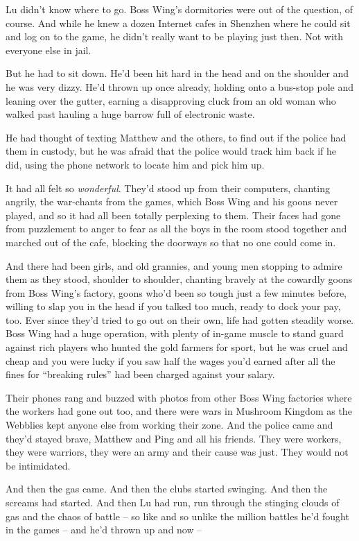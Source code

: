 Lu didn't know where to go. Boss Wing's dormitories were out of the
question, of course. And while he knew a dozen Internet cafes in
Shenzhen where he could sit and log on to the game, he didn't
really want to be playing just then. Not with everyone else in
jail.

But he had to sit down. He'd been hit hard in the head and on the
shoulder and he was very dizzy. He'd thrown up once already,
holding onto a bus-stop pole and leaning over the gutter, earning a
disapproving cluck from an old woman who walked past hauling a huge
barrow full of electronic waste.

He had thought of texting Matthew and the others, to find out if
the police had them in custody, but he was afraid that the police
would track him back if he did, using the phone network to locate
him and pick him up.

It had all felt so \emph{wonderful}. They'd stood up from their
computers, chanting angrily, the war-chants from the games, which
Boss Wing and his goons never played, and so it had all been
totally perplexing to them. Their faces had gone from puzzlement to
anger to fear as all the boys in the room stood together and
marched out of the cafe, blocking the doorways so that no one could
come in.

And there had been girls, and old grannies, and young men stopping
to admire them as they stood, shoulder to shoulder, chanting
bravely at the cowardly goons from Boss Wing's factory, goons who'd
been so tough just a few minutes before, willing to slap you in the
head if you talked too much, ready to dock your pay, too. Ever
since they'd tried to go out on their own, life had gotten steadily
worse. Boss Wing had a huge operation, with plenty of in-game
muscle to stand guard against rich players who hunted the gold
farmers for sport, but he was cruel and cheap and you were lucky if
you saw half the wages you'd earned after all the fines for
``breaking rules'' had been charged against your salary.

Their phones rang and buzzed with photos from other Boss Wing
factories where the workers had gone out too, and there were wars
in Mushroom Kingdom as the Webblies kept anyone else from working
their zone. And the police came and they'd stayed brave, Matthew
and Ping and all his friends. They were workers, they were
warriors, they were an army and their cause was just. They would
not be intimidated.

And then the gas came. And then the clubs started swinging. And
then the screams had started. And then Lu had run, run through the
stinging clouds of gas and the chaos of battle -- so like and so
unlike the million battles he'd fought in the games -- and he'd
thrown up and now --

